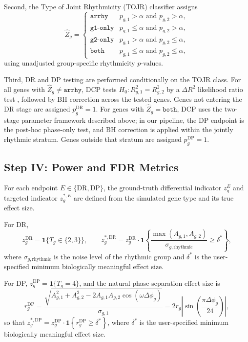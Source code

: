 \documentclass{article}
\begin{document}
Second, the Type of Joint Rhythmicity (TOJR) classifier assigns
\begin{equation}
\hat{Z}_g =
\begin{cases}
\texttt{arrhy} & p_{g,1}>\alpha \text{ and } p_{g,2}>\alpha,\\
\texttt{g1-only} & p_{g,1}\leq\alpha \text{ and } p_{g,2}>\alpha,\\
\texttt{g2-only} & p_{g,1}>\alpha \text{ and } p_{g,2}\leq\alpha,\\
\texttt{both} & p_{g,1}\leq\alpha \text{ and } p_{g,2}\leq\alpha,
\end{cases}
\label{eq:tojr}
\end{equation}
using unadjusted group-specific rhythmicity $p$-values.

Third, DR and DP testing are performed conditionally on the TOJR class. For
all genes with $\hat{Z}_g\neq\texttt{arrhy}$, DCP tests
$H_0:R^2_{g,1}=R^2_{g,2}$ by a $\Delta R^2$ likelihood ratio test
\cite{ding2021likelihood}, followed by BH correction across the tested genes.
Genes not entering the DR stage are assigned $p_g^{\mathrm{DR}}=1$.
For genes with $\hat{Z}_g=\texttt{both}$, DCP uses the two-stage parameter
framework described above; in our pipeline, the DP endpoint is the post-hoc
phase-only test, and BH correction is applied within the jointly rhythmic
stratum. Genes outside that stratum are assigned $p_g^{\mathrm{DP}}=1$.

\subsection{Step IV: Power and FDR Metrics}
\label{sec:metrics}

For each endpoint $E\in\{\mathrm{DR},\mathrm{DP}\}$, the ground-truth
differential indicator $z_g^E$ and targeted indicator $z_g^{*,E}$ are defined
from the simulated gene type and its true effect size.

For DR,
\begin{equation}
z_g^{\mathrm{DR}} = \mathbf{1}\{T_g\in\{2,3\}\},
\qquad
z_g^{*,\mathrm{DR}}
=
z_g^{\mathrm{DR}}
\cdot
\mathbf{1}\!\left\{
\frac{\max(A_{g,1},A_{g,2})}{\sigma_{g,\mathrm{rhythmic}}}\geq\delta^*
\right\},
\label{eq:dr_target}
\end{equation}
where $\sigma_{g,\mathrm{rhythmic}}$ is the noise level of the rhythmic group and $\delta^*$ is the user-specified minimum biologically meaningful effect size.

For DP, \(z_g^{\mathrm{DP}}=\mathbf{1}\{T_g=4\}\), and the natural
phase-separation effect size is
\begin{equation}
r_g^{\mathrm{DP}}
=
\frac{\sqrt{A_{g,1}^2+A_{g,2}^2-2A_{g,1}A_{g,2}\cos(\omega\Delta\phi_g)}}{\sigma_{g,1}}
=
2r_g\left|\sin\!\left(\frac{\pi\Delta\phi_g}{24}\right)\right|,
\label{eq:dp_snr}
\end{equation}
so that \(z_g^{*,\mathrm{DP}}=z_g^{\mathrm{DP}}\cdot
\mathbf{1}\!\left\{r_g^{\mathrm{DP}}\geq\delta^*\right\}\), where $\delta^*$ is the user-specified minimum biologically meaningful effect size.
\end{document}
